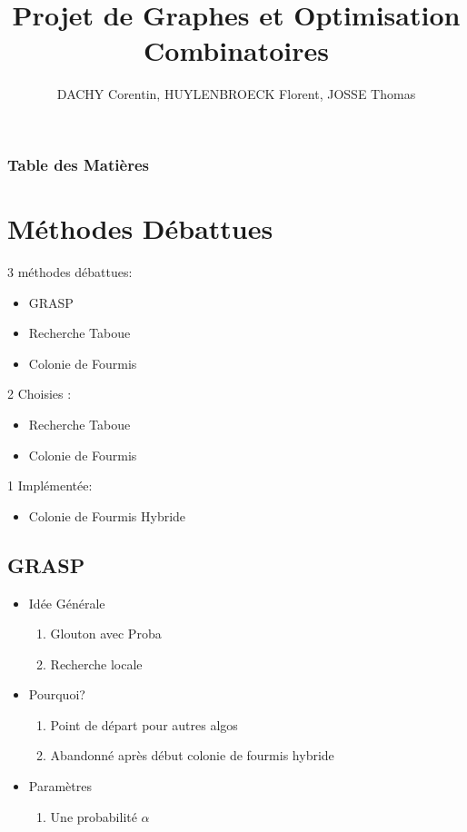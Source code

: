 \documentclass[b]{beamer}
\title[Projet de Graphes et Optimisation Combinatoire]{Projet de Graphes et Optimisation Combinatoires}
\author{DACHY Corentin, HUYLENBROECK Florent, JOSSE Thomas}
\begin{document}
\begin{frame}
	\titlepage
\end{frame}

\begin{frame}
	\frametitle{Table des Matières}
	\tableofcontents
\end{frame}

\section{Méthodes Débattues}

\begin{frame}
	
	3 méthodes débattues:
	\begin{itemize}
		\item GRASP
		\item Recherche Taboue
		\item Colonie de Fourmis
	\end{itemize}
	2 Choisies :
		\begin{itemize}
			\item Recherche Taboue
			\item Colonie de Fourmis
		\end{itemize}
	1 Implémentée:
		\begin{itemize}
			\item Colonie de Fourmis Hybride
		\end{itemize}
\end{frame}

\subsection{GRASP}

\begin{frame}

\begin{itemize}
	\item Idée Générale
	\begin{enumerate}
		\item Glouton avec Proba
		\item Recherche locale 
	\end{enumerate}
	\item Pourquoi? 
	\begin{enumerate}
		\item Point de départ pour autres algos
		\item Abandonné après début colonie de fourmis hybride
	\end{enumerate}
	\item Paramètres
	\begin{enumerate}
		\item Une probabilité $\alpha$
	\end{enumerate}
\end{itemize}

\end{frame}
\end{document}
